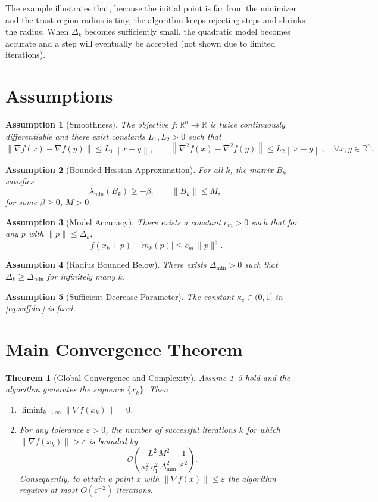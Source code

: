 \documentclass{article}
\newtheorem{theorem}{Theorem}
\newtheorem{assumption}{Assumption}
\newcommand{\norm}[1]{\left\lVert #1\right\rVert}
\newcommand{\R}{\mathbb{R}}
\begin{document}
The example illustrates that, because the initial point is far from the minimizer and the trust‑region radius is tiny, the algorithm keeps rejecting steps and shrinks the radius. When $\Delta_{k}$ becomes sufficiently small, the quadratic model becomes accurate and a step will eventually be accepted (not shown due to limited iterations).

\newpage
\section*{Assumptions}
\begin{assumption}[Smoothness]
\label{ass:smooth}
The objective $f:\R^{n}\rightarrow\R$ is twice continuously differentiable and there exist constants $L_{1},L_{2}>0$ such that
\[
\norm{\nabla f(x)-\nabla f(y)}\le L_{1}\norm{x-y},
\qquad
\norm{\nabla^{2}f(x)-\nabla^{2}f(y)}\le L_{2}\norm{x-y},
\quad\forall x,y\in\R^{n}.
\]
\end{assumption}
\begin{assumption}[Bounded Hessian Approximation]
\label{ass:hessian}
For all $k$, the matrix $B_{k}$ satisfies
\[
\lambda_{\min}(B_{k})\ge -\beta,\qquad 
\|B_{k}\|\le M,
\]
for some $\beta\ge0$, $M>0$.
\end{assumption}
\begin{assumption}[Model Accuracy]
\label{ass:model}
There exists a constant $c_{m}>0$ such that for any $p$ with $\|p\|\le\Delta_{k}$,
\[
\bigl|f(x_{k}+p)-m_{k}(p)\bigr|\le c_{m}\,\|p\|^{3}.
\]
\end{assumption}
\begin{assumption}[Radius Bounded Below]
\label{ass:radius}
There exists $\Delta_{\min}>0$ such that $\Delta_{k}\ge\Delta_{\min}$ for infinitely many $k$.
\end{assumption}
\begin{assumption}[Sufficient‑Decrease Parameter]
\label{ass:kappa}
The constant $\kappa_{\!c}\in(0,1]$ in \eqref{eq:suffdec} is fixed.
\end{assumption}

\section*{Main Convergence Theorem}
\begin{theorem}[Global Convergence and Complexity]
\label{thm:global}
Assume \ref{ass:smooth}–\ref{ass:kappa} hold and the algorithm generates the sequence $\{x_{k}\}$. Then
\begin{enumerate}[label=(\roman*)]
\item \label{itm:gradzero} $\displaystyle\liminf_{k\to\infty}\norm{\nabla f(x_{k})}=0$.
\item \label{itm:complexity} For any tolerance $\varepsilon>0$, the number of successful iterations $k$ for which $\norm{\nabla f(x_{k})}>\varepsilon$ is bounded by
\[
\mathcal{O}\!\left(\frac{L_{1}^{2}\,M^{2}}{\kappa_{\!c}^{2}\,\eta_{1}^{2}\,\Delta_{\min}^{2}}\;\frac{1}{\varepsilon^{2}}\right).
\]
Consequently, to obtain a point $x$ with $\norm{\nabla f(x)}\le\varepsilon$ the algorithm requires at most $O(\varepsilon^{-2})$ iterations.
\end{enumerate}
\end{theorem}
\end{document}
